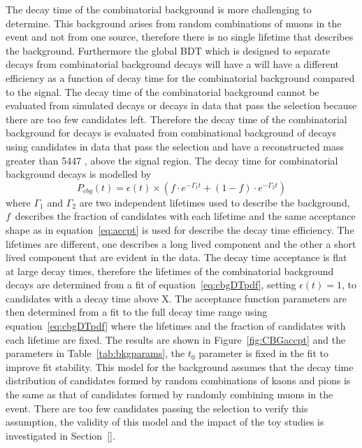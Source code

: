 {The decay time \pdf of the combinatorial background is more challenging to determine. This background arises from random combinations of muons in the event and not from one source, therefore there is no single lifetime that describes the background. Furthermore the global BDT which is designed to separate \bsmumu decays from combinatorial background decays will have a will have a different efficiency as a function of decay time for the combinatorial background compared to the \bsmum signal. The decay time \pdf of the combinatorial background cannot be evaluated from simulated decays or decays in data that pass the \bsmumu selection because there are too few candidates left. %
Therefore the decay time \pdf of the combinatorial background for \bsmumu decays is evaluated from combinational background of \bhh decays using candidates in data that pass the \bhh selection and have a reconstructed mass greater than 5447 \mevcc, above the \bs signal region. The decay time \pdf for combinatorial background decays is modelled by
\begin{equation}
P_{cbg}(t) = \epsilon(t)\times \left( f \cdot e^{-\Gamma_{1}t} + (1-f)\cdot e^{-\Gamma_{2}t} \right)
\label{eq:cbgDTpdf}
\end{equation}
where $\Gamma_{1}$ and $\Gamma_{2}$ are two independent lifetimes used to describe the background, $f$~describes the fraction of candidates with each lifetime and the same acceptance shape as in equation~\ref{eq:accpt} is used for describe the decay time efficiency. The lifetimes are different, one describes a long lived component and the other a short lived component that are evident in the data. The decay time acceptance is flat at large decay times, therefore the lifetimes of the combinatorial background decays are determined from a \ml fit of equation~\ref{eq:cbgDTpdf}, setting $\epsilon(t)=1$, to candidates with a decay time above X. The acceptance function parameters are then determined from a \ml fit to the full decay time range using equation~\ref{eq:cbgDTpdf} where the lifetimes and the fraction of candidates with each lifetime are fixed. The results are shown in Figure~\ref{fig:CBGaccpt} and the \pdf parameters in Table~\ref{tab:bkgparams}, the $t_{0}$ parameter is fixed in the fit to improve fit stability. This model for the background assumes that the decay time distribution of \bhh candidates formed by random combinations of kaons and pions is the same as that of \bsmumu candidates formed by randomly combining muons in the event. There are too few candidates passing the \bsmumu selection to verify this assumption, the validity of this model and the impact of the toy studies is investigated in Section~\ref{}.%
}
